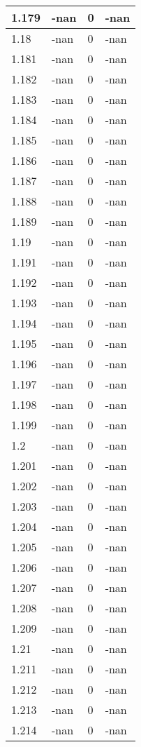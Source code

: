 \documentclass[a4paper,14pt]{extarticle}
\begin{document}
\begin{longtable}{||m{3cm}||m{3cm}|m{3cm}||m{3cm}||}
\hline
1.179 & -nan & 0 & -nan\\
\hline
1.18 & -nan & 0 & -nan\\
\hline
1.181 & -nan & 0 & -nan\\
\hline
1.182 & -nan & 0 & -nan\\
\hline
1.183 & -nan & 0 & -nan\\
\hline
1.184 & -nan & 0 & -nan\\
\hline
1.185 & -nan & 0 & -nan\\
\hline
1.186 & -nan & 0 & -nan\\
\hline
1.187 & -nan & 0 & -nan\\
\hline
1.188 & -nan & 0 & -nan\\
\hline
1.189 & -nan & 0 & -nan\\
\hline
1.19 & -nan & 0 & -nan\\
\hline
1.191 & -nan & 0 & -nan\\
\hline
1.192 & -nan & 0 & -nan\\
\hline
1.193 & -nan & 0 & -nan\\
\hline
1.194 & -nan & 0 & -nan\\
\hline
1.195 & -nan & 0 & -nan\\
\hline
1.196 & -nan & 0 & -nan\\
\hline
1.197 & -nan & 0 & -nan\\
\hline
1.198 & -nan & 0 & -nan\\
\hline
1.199 & -nan & 0 & -nan\\
\hline
1.2 & -nan & 0 & -nan\\
\hline
1.201 & -nan & 0 & -nan\\
\hline
1.202 & -nan & 0 & -nan\\
\hline
1.203 & -nan & 0 & -nan\\
\hline
1.204 & -nan & 0 & -nan\\
\hline
1.205 & -nan & 0 & -nan\\
\hline
1.206 & -nan & 0 & -nan\\
\hline
1.207 & -nan & 0 & -nan\\
\hline
1.208 & -nan & 0 & -nan\\
\hline
1.209 & -nan & 0 & -nan\\
\hline
1.21 & -nan & 0 & -nan\\
\hline
1.211 & -nan & 0 & -nan\\
\hline
1.212 & -nan & 0 & -nan\\
\hline
1.213 & -nan & 0 & -nan\\
\hline
1.214 & -nan & 0 & -nan\\

\end{longtable}
\end{document}
